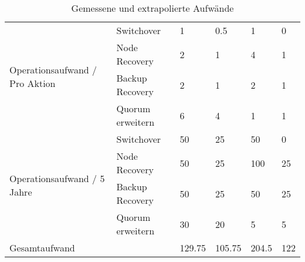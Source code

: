 \begin{table}[H]
{\begin{tabular}{@{}llllll@{}}
\multirow{4}{*}{Operationsaufwand / Pro Aktion} & Switchover                             & 1                 & 0.5                          & 1                 & 0          \\
                                                & Node Recovery                          & 2                 & 1                            & 4                 & 1          \\
                                                & Backup Recovery                        & 2                 & 1                            & 2                 & 1          \\
                                                & Quorum erweitern                       & 6                 & 4                            & 1                 & 1          \\
\multirow{4}{*}{Operationsaufwand / 5 Jahre}    & Switchover                             & 50                & 25                           & 50                & 0          \\
                                                & Node Recovery                          & 50                & 25                           & 100               & 25         \\
                                                & Backup Recovery                        & 50                & 25                           & 50                & 25         \\
                                                & Quorum erweitern                       & 30                & 20                           & 5                 & 5          \\ \midrule
\multicolumn{2}{l}{Gesamtaufwand}                                                        & 129.75            & 105.75                       & 204.5             & 122        \\ \bottomrule
\end{tabular}%
}
\caption{Gemessene und extrapolierte Aufwände}
\label{tab:time_investment}
\end{table}